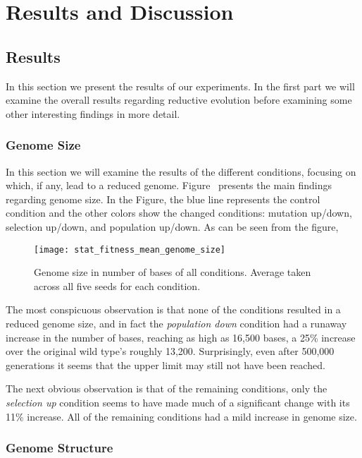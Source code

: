 \chapter{Results and Discussion}\label{ch:results_discussion}


\section{Results}\label{results}
In this section we present the results of our experiments. In the first part we will examine the overall results regarding reductive evolution before examining some other interesting findings in more detail.

\subsection{Genome Size}
In this section we will examine the results of the different conditions, focusing on which, if any, lead to a reduced genome. Figure~%
presents the main findings regarding genome size. In the Figure, the blue line %
represents the control condition and the other colors show the changed conditions: mutation up/down, selection up/down, and population up/down. As can be seen from the figure, 
\begin{figure}[H]
	\texttt{[image: stat\_fitness\_mean\_genome\_size]}
	\centering
	\caption[Genome size]{Genome size in number of bases of all conditions. Average taken across all five seeds for each condition.}
	\label{fig:genome_size}
\end{figure}
The most conspicuous observation is that none of the conditions resulted in a reduced genome size, and in fact the \textit{population down} condition had a runaway increase in the number of bases, reaching as high as 16,500 bases, a 25\% increase over the original wild type's roughly 13,200. Surprisingly, even after 500,000 generations it seems that the upper limit may still not have been reached. 

The next obvious observation is that of the remaining conditions, only the \textit{selection up} condition seems to have made much of a significant change with its 11\% increase. All of the remaining conditions had a mild increase in genome size. 


\subsection{Genome Structure}

